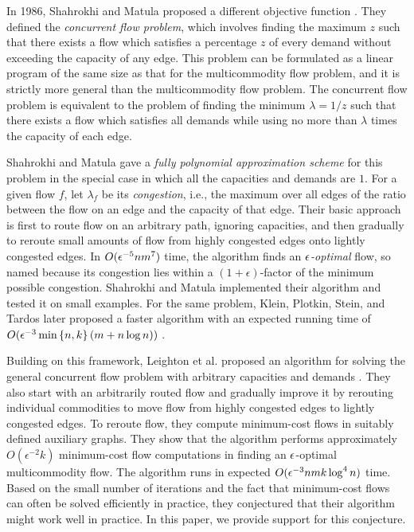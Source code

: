 In 1986, Shahrokhi and Matula proposed a different objective function
\cite{ShahrokhiM88}.  
They defined the {\em concurrent flow problem}, which involves 
finding the maximum $z$ such that there exists a flow which satisfies 
a percentage $z$ of every demand without exceeding the capacity
of any edge.
This problem can be formulated as a linear program of the same size 
as that for the multicommodity flow problem, 
and it is strictly more general than the multicommodity flow problem.
The concurrent flow problem is equivalent to the problem of finding
the minimum $\lambda = 1/z$ such that there exists a flow which
satisfies all demands while using no more than $\lambda$ times
the capacity of each edge.

Shahrokhi and Matula gave a {\em fully polynomial approximation scheme} 
for this problem in the special case in which all the capacities and
demands are $1$.  For a given flow $f$, let $\lambda_f$ be its
{\em congestion}, i.e., the maximum over all edges of the
ratio between the flow on an edge and the capacity of that edge.
Their basic approach is first to route flow on an arbitrary path,
ignoring capacities, and then gradually to reroute small amounts of flow from  
highly congested edges onto lightly congested edges.
In $O({\epsilon}^{-5} n m^7)$ time,
the algorithm finds an {\em $\epsilon$-optimal} flow, so named because its
congestion lies within a $(1 + \epsilon)$-factor of the minimum possible 
congestion.
Shahrokhi and Matula implemented their algorithm and tested it 
on small examples.  
For the same problem,
Klein, Plotkin, Stein, and Tardos later proposed a faster algorithm
with an expected running time of $O(\epsilon^{-3} \min\left\{ n,k \right\} (m + n \log n))$
\cite{KleinPST91}.

Building on this framework, Leighton et al. proposed an algorithm 
for solving the general concurrent flow problem with
arbitrary capacities and demands \cite{LeightonMPSTT91}.
They also start with an arbitrarily routed flow and gradually improve it
by rerouting individual commodities to move flow from highly congested edges 
to lightly congested edges.
To reroute flow, they compute minimum-cost flows in suitably defined
auxiliary graphs.  
They show that the algorithm performs approximately $O(\epsilon^{-2}k)$
minimum-cost flow computations in finding an $\epsilon$-optimal 
multicommodity flow.  
The algorithm runs in expected $O(\epsilon^{-3} nmk \log^4n)$ time.  
Based on the small number of iterations and the fact that minimum-cost
flows can often be solved efficiently in practice,
they conjectured that their algorithm might work well in practice.
In this paper, we provide support for this conjecture.


